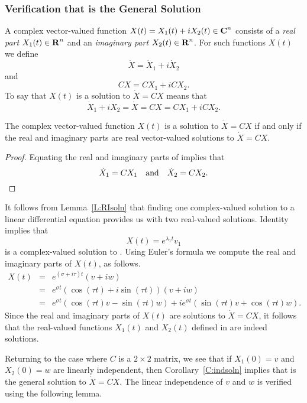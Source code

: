 \documentclass{ximera}
\begin{document}
\subsubsection*{Verification that \protect{} is the General Solution}

A complex vector-valued function $X(t)=X_1(t)+iX_2(t)\in\mbox{$\bf{C}$}^n$
 consists of
a {\em real part\/} $X_1(t)\in\mbox{$\bf{R}$}^n$ and an {\em imaginary part\/}
$X_2(t)\in\mbox{$\bf{R}$}^n$.  For such functions $X(t)$ we define
\[
\dot{X} = \dot{X}_1+i\dot{X}_2
\]
and
\[
CX = CX_1 + iCX_2.
\]
To say that $X(t)$ is a solution to $\dot{X}=CX$ means that
\begin{equation}  \label{E:X1X2}
\dot{X}_1+i\dot{X}_2 = \dot{X} = CX = CX_1 + iCX_2.
\end{equation}

\begin{lemma}  \label{L:RIsoln}
The complex vector-valued function $X(t)$ is a solution to $\dot{X}=CX$ if
and only if the real and imaginary parts are real vector-valued solutions
to $\dot{X}=CX$.
\end{lemma}

\begin{proof} Equating the real and imaginary parts of  implies that
\[
\dot{X}_1 = CX_1 \quad\mbox{and}\quad \dot{X}_2 = CX_2.
\]
\end{proof}

It follows from Lemma~\ref{L:RIsoln} that finding one complex-valued solution
to a linear differential equation provides us with two real-valued solutions.
Identity  implies that
\[
X(t) = e^{\lambda_1 t}v_1
\]
is a complex-valued solution to .  Using Euler's formula we
compute the real and imaginary parts of $X(t)$, as follows.
\begin{eqnarray*}
X(t) & = & e^{(\sigma+i\tau)t}(v+iw) \\
& = & e^{\sigma t} (\cos(\tau t)+i\sin(\tau t))(v+iw)\\
& = & e^{\sigma t}(\cos(\tau t)v-\sin(\tau t)w)+
ie^{\sigma t}(\sin(\tau t)v+\cos(\tau t)w).
\end{eqnarray*}
Since the real and imaginary parts of $X(t)$ are solutions to $\dot{X}=CX$, it
follows that the real-valued functions $X_1(t)$ and $X_2(t)$ defined in
 are indeed solutions.

Returning to the case where $C$ is a $2\times 2$ matrix, we see that if
$X_1(0)=v$ and $X_2(0)=w$ are linearly independent, then
Corollary~\ref{C:indsoln} implies that  is the general solution to
$\dot{X}=CX$.  The linear independence of $v$ and $w$ is verified using the
following lemma.
\end{document}
